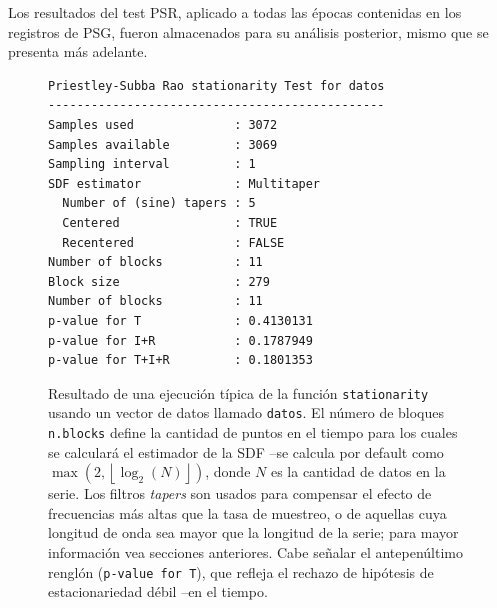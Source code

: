 Los resultados del test PSR, aplicado a todas las \'epocas contenidas en los registros de PSG,
fueron almacenados para su an\'alisis posterior, mismo que se presenta m\'as adelante.

\begin{figure}
\centering
\begin{lstlisting}
Priestley-Subba Rao stationarity Test for datos
-----------------------------------------------
Samples used              : 3072 
Samples available         : 3069 
Sampling interval         : 1 
SDF estimator             : Multitaper 
  Number of (sine) tapers : 5 
  Centered                : TRUE 
  Recentered              : FALSE 
Number of blocks          : 11 
Block size                : 279 
Number of blocks          : 11 
p-value for T             : 0.4130131 
p-value for I+R           : 0.1787949 
p-value for T+I+R         : 0.1801353 
\end{lstlisting}
\caption{Resultado de una ejecuci\'on t\'ipica de la funci\'on \texttt{stationarity}
usando un vector de datos llamado \texttt{datos}. 
El n\'umero de bloques \texttt{n.blocks} define la cantidad de puntos en el tiempo
para los cuales se calcular\'a el estimador de la SDF
--se calcula por default como
$\max \left( 2 , \left\lfloor \log_2\left( N \right) \right\rfloor \right)$, donde
$N$ es la cantidad de datos en la serie.
Los filtros \textit{tapers} son usados para compensar el efecto de frecuencias m\'as altas que la 
tasa de muestreo, o de aquellas cuya longitud de onda sea mayor que la longitud de la serie;
para mayor informaci\'on vea secciones anteriores.
Cabe se\~nalar el antepen\'ultimo rengl\'on (\texttt{p-value for T}), que refleja el rechazo de 
hip\'otesis de estacionariedad d\'ebil --en el tiempo.}
\label{res_psr}
\end{figure}



